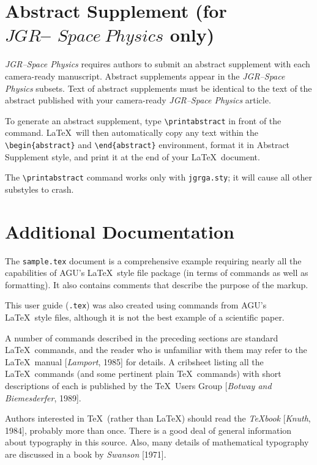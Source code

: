 \begin{article}
\section{Abstract Supplement (for \protect\\
\protect\boldmath $JGR$--\protect\boldmath 
$Space~Physics$ only)}

{\it JGR--Space Physics} requires authors to submit 
an abstract supplement with each camera-ready manuscript.
Abstract supplements appear in the {\it JGR--Space Physics}
subsets.  Text of abstract supplements must be 
identical to the text of the abstract published 
with your camera-ready {\it JGR--Space Physics} article. 

To generate an abstract supplement, type \linebreak
\verb"\printabstract" in front of the 
\verb"" command.  \LaTeX\ will then 
automatically copy any text within the 
\verb"\begin{abstract}" and \verb"\end{abstract}" 
environment, format it in Abstract Supplement style, 
and print it at the end of your \LaTeX\ document.

The \verb"\printabstract" command works only with 
{\tt jgrga.sty}; it will cause all other substyles 
to crash.


\section{Additional Documentation}

The \verb"sample.tex" document is a comprehensive 
example requiring nearly all the capabilities of AGU's
\LaTeX\ style file package (in terms of commands as well
as formatting).  It also contains comments that describe
the purpose of the markup.

This user guide ({\tt\jobname.tex}) was also created 
using commands from AGU's \LaTeX\ style files, although 
it is not the best example of a scientific paper.

A number of commands described in the preceding sections
are standard \LaTeX\ commands, and the reader who is 
unfamiliar with them may refer to the \LaTeX\ manual
[{\it Lamport}, 1985] for details.  A cribsheet listing
all the \LaTeX\ commands (and some pertinent plain \TeX\
commands) with short descriptions of each is published
by the \TeX\ Users Group [{\it Botway and Biemesderfer},
1989].

Authors interested in \TeX\ (rather than \LaTeX) should 
read the {\it\TeX book} [{\it Knuth}, 1984], probably more 
than once.  There is a good deal of general information 
about typography in this source.  Also, many details of 
mathematical typography are discussed in a book by 
{\it Swanson} [1971].



\end{article}
